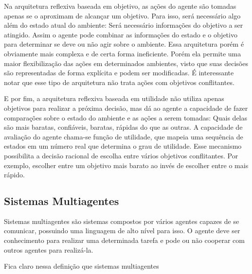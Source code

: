 Na arquitetura reflexiva baseada em objetivo, as ações do agente são tomadas apenas se o aproximam de alcançar um objetivo. Para isso, será necessário algo além do estado atual do ambiente: Será necessário informações do objetivo a ser atingido. Assim o agente pode combinar as informações do estado e o objetivo para determinar se deve ou não agir sobre o ambiente. Essa arquitetura porém é obviamente mais complexa e de certa forma ineficiente. Porém ela permite uma maior flexibilização das ações em determinados ambientes, visto que suas decisões são representadas de forma explícita e podem ser modificadas. É interessante notar que esse tipo de arquitetura não trata ações com objetivos conflitantes.

E por fim, a arquitetura reflexiva baseada em utilidade não utiliza apenas objetivos para realizar a próxima decisão, mas dá ao agente a capacidade de fazer comparações sobre o estado do ambiente e as ações a serem tomadas: Quais delas são mais baratas, confiáveis, baratas, rápidas do que as outras. A capacidade de avaliação do agente chama-se função de utilidade, que mapeia uma sequência de estados em um número real que determina o grau de utilidade. Esse mecanismo possibilita a decisão racional de escolha entre vários objetivos conflitantes. Por exemplo, escolher entre um objetivo mais barato ao invés de escolher entre o mais rápido.

\subsection{Sistemas Multiagentes}

Sistemas multiagentes são sistemas compostos por vários agentes capazes de se comunicar, possuindo uma linguagem de alto nível para isso. O agente deve ser conhecimento para realizar uma determinada tarefa e pode ou não cooperar com outros agentes para realizá-la.

Fica claro nessa definição que sistemas multiagentes

